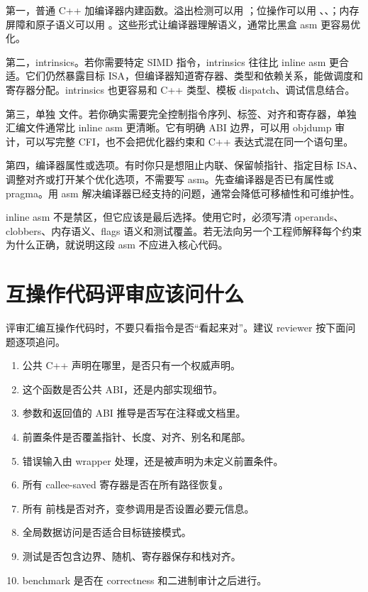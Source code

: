 第一，普通 C++ 加编译器内建函数。溢出检测可以用 ；位操作可以用 、、；内存屏障和原子语义可以用 。这些形式让编译器理解语义，通常比黑盒 asm 更容易优化。

第二，intrinsics。若你需要特定 SIMD 指令，intrinsics 往往比 inline asm 更合适。它们仍然暴露目标 ISA，但编译器知道寄存器、类型和依赖关系，能做调度和寄存器分配。intrinsics 也更容易和 C++ 类型、模板 dispatch、调试信息结合。

第三，单独  文件。若你确实需要完全控制指令序列、标签、对齐和寄存器，单独汇编文件通常比 inline asm 更清晰。它有明确 ABI 边界，可以用 objdump 审计，可以写完整 CFI，也不会把优化器约束和 C++ 表达式混在同一个语句里。

第四，编译器属性或选项。有时你只是想阻止内联、保留帧指针、指定目标 ISA、调整对齐或打开某个优化选项，不需要写 asm。先查编译器是否已有属性或 pragma。用 asm 解决编译器已经支持的问题，通常会降低可移植性和可维护性。

inline asm 不是禁区，但它应该是最后选择。使用它时，必须写清 operands、clobbers、内存语义、flags 语义和测试覆盖。若无法向另一个工程师解释每个约束为什么正确，就说明这段 asm 不应进入核心代码。

\section{互操作代码评审应该问什么}

评审汇编互操作代码时，不要只看指令是否“看起来对”。建议 reviewer 按下面问题逐项追问。

\begin{enumerate}
  \item 公共 C++ 声明在哪里，是否只有一个权威声明。
  \item 这个函数是否公共 ABI，还是内部实现细节。
  \item 参数和返回值的 ABI 推导是否写在注释或文档里。
  \item 前置条件是否覆盖指针、长度、对齐、别名和尾部。
  \item 错误输入由 wrapper 处理，还是被声明为未定义前置条件。
  \item 所有 callee-saved 寄存器是否在所有路径恢复。
  \item 所有  前栈是否对齐，变参调用是否设置必要元信息。
  \item 全局数据访问是否适合目标链接模式。
  \item 测试是否包含边界、随机、寄存器保存和栈对齐。
  \item benchmark 是否在 correctness 和二进制审计之后进行。
\end{enumerate}


